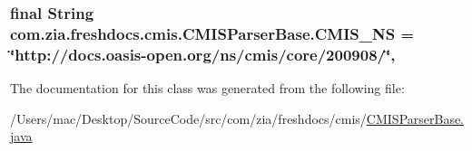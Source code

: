 \hypertarget{classcom_1_1zia_1_1freshdocs_1_1cmis_1_1_c_m_i_s_parser_base_ac51f941d96f4665be4cf8bd6882089a1}{
\subsubsection[{C\-M\-I\-S\-\_\-\-N\-S}]{\setlength{\rightskip}{0pt plus 5cm}final String com.\-zia.\-freshdocs.\-cmis.\-C\-M\-I\-S\-Parser\-Base.\-C\-M\-I\-S\-\_\-\-N\-S = \char`\"{}http\-://docs.\-oasis-\/open.\-org/ns/cmis/core/200908/\char`\"{}\hspace{0.3cm}{\ttfamily [static]}, {\ttfamily [protected]}}}\label{classcom_1_1zia_1_1freshdocs_1_1cmis_1_1_c_m_i_s_parser_base_ac51f941d96f4665be4cf8bd6882089a1}


The documentation for this class was generated from the following file\-:\begin{DoxyCompactItemize}
\item 
/\-Users/mac/\-Desktop/\-Source\-Code/src/com/zia/freshdocs/cmis/\hyperlink{_c_m_i_s_parser_base_8java}{C\-M\-I\-S\-Parser\-Base.\-java}\end{DoxyCompactItemize}
